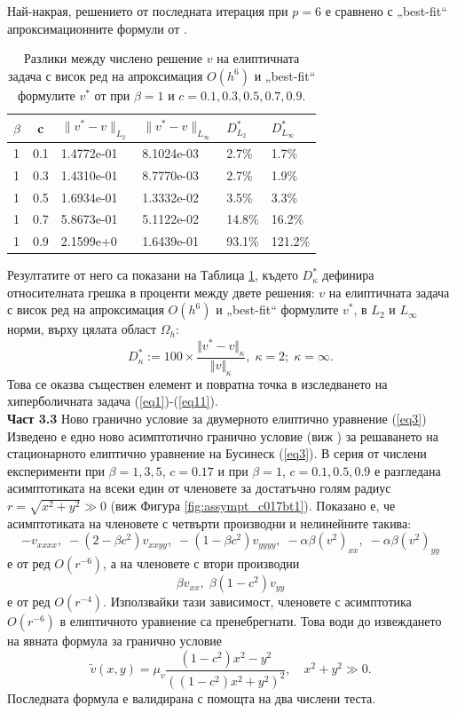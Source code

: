 \documentclass[a5paper]{article}
\newcommand{\be}{\begin{equation}}
\newcommand{\ee}{\end{equation}}
\newcommand{\rf}[1]{(\ref{#1})}
\theoremstyle{remark}
\begin{document}
\begin{large}
Най-накрая, решението от последната итерация при $p=6$ е сравнено с „best-fit“ апроксимационните формули от \cite{ref15}. 
\begin{table}[ht]
\begin{small}
\centering
\begin{tabular}{|l|c|l l|l l|}
\hline
\hline 
$\beta$	& c 	& $\|v^*-v \|_{L_2 }$ & $\|v^*-v \|_{L_\infty }$  	& $D^*_{L_2}$	& $D^*_{L_\infty }$	\\
\hline 
1& 		0.1	&	1.4772e-01 		& 	8.1024e-03 				& 2.7\%			& 1.7\%		\\
\hline 
1& 		0.3 	&	1.4310e-01 		& 	8.7770e-03				& 2.7\%			& 1.9\%		\\
\hline 
1& 		0.5 	&	1.6934e-01 		& 	1.3332e-02				& 3.5\%			& 3.3\%		\\
\hline 
1& 		0.7 	&	5.8673e-01		& 	5.1122e-02				& 14.8\%		& 16.2\%	\\
\hline 
1& 		0.9	&	2.1599e+0 		& 	1.6439e-01				& 93.1\%		& 121.2\%	\\
\hline 
\hline 
\end{tabular}
\caption{Разлики между числено решение $v$ на елиптичната задача с висок ред на апроксимация $O(h^6)$ и „best-fit“ формулите $v^*$ от \cite{ref15} при $\beta=1$ и $c=0.1, 0.3, 0.5, 0.7, 0.9$.}
\label{tab:diff-beta1}
\end{small}
\end{table}
Резултатите от него са показани на Таблица \ref{tab:diff-beta1}, където 
$D^*_{\kappa}$ дефинира относителната грешка в проценти между двете решения: $v$ на елиптичната задача с висок ред на апроксимация $O(h^6)$ и „best-fit“ формулите $v^*$, в ${L_2 }$ и ${L_\infty}$ норми, върху цялата област $\Omega_h$:
\be\label{diffvv}
D^*_{\kappa} := 100 \times \frac{\Vert v^*-v \Vert_{\kappa} }{ \Vert v \Vert_{\kappa} }, \; \kappa=2; \; \kappa=\infty.
\ee
Това се оказва съществен елемент и повратна точка в изследването на хиперболичната задача \rf{eq1}-\rf{eq11}. \\

\textbf{Част 3.3} Ново гранично условие за двумерното елиптично уравнение \rf{eq3}
Изведено е едно ново асимптотично гранично условие (виж \cite{bnd}) за решаването на стационарното елиптично уравнение на Бусинеск \rf{eq3}. В серия от числени експерименти при $\beta=1,3,5$, $c=0.17$ и при $\beta=1$, $c=0.1, 0.5, 0.9$ е разгледана асимптотиката на всеки един от членовете за достатъчно голям радиус $r=\sqrt{x^2 + y^2} \gg 0$ (виж Фигура \ref{fig:assympt_c017bt1}). Показано е, че асимптотиката на членовете с четвърти производни и нелинейните такива: 
$$- v_{xxxx}, \;  - (2-\beta c^2)v_{xxyy},  \;  - (1-\beta c^2)v_{yyyy}, \;  - \alpha \beta (v^2)_{xx}, \; - \alpha \beta (v^2)_{yy}$$
е от ред $O(r^{-6})$, а на членовете с втори производни 
$$\beta v_{xx}, \; \beta (1-c^2) v_{yy}$$
 е от ред $O(r^{-4})$. Използвайки тази зависимост, членовете с асимптотика $O(r^{-6})$ в елиптичното уравнение са пренебрегнати. Това води до извеждането на явната формула за гранично условие
\be\label{bndv}
\tilde v(x, y) = \mu_v \frac{ (1-c^2) x^2 - y^2 }{ ((1-c^2) x^2 + y^2)^2 }, \quad x^2+y^2 \gg 0.
\ee
Последната формула е валидирана с помощта на два числени теста. 


\end{large}
\end{document}
